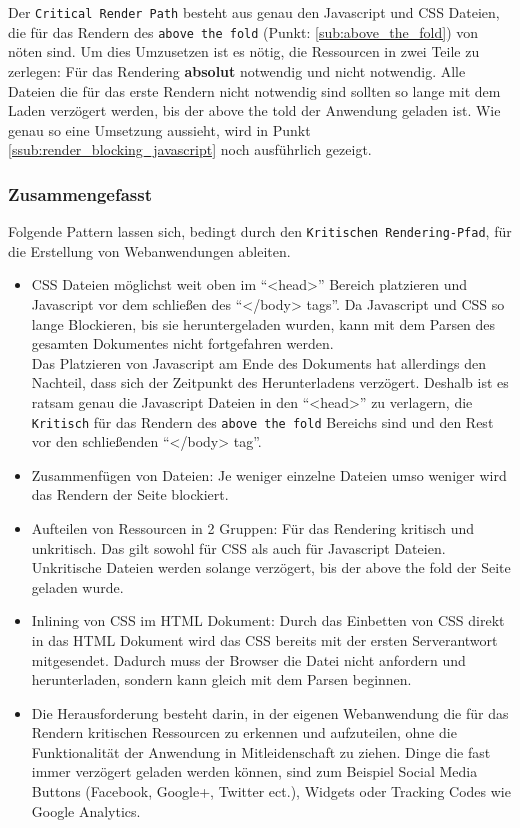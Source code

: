 			Der \texttt{Critical Render Path} besteht aus genau den Javascript und CSS Dateien, die für das Rendern des \texttt{above the fold} (Punkt: \ref{sub:above_the_fold}) von nöten sind. Um dies Umzusetzen ist es nötig, die Ressourcen in zwei Teile zu zerlegen: Für das Rendering \textbf{absolut} notwendig und nicht notwendig. Alle Dateien die für das erste Rendern nicht notwendig sind sollten so lange mit dem Laden verzögert werden, bis der above the told der Anwendung geladen ist. Wie genau so eine Umsetzung aussieht, wird in Punkt \ref{ssub:render_blocking_javascript} noch ausführlich gezeigt.


		\subsubsection{Zusammengefasst} %
		\label{ssub:zusammengefasst_render_path}
		  Folgende Pattern lassen sich, bedingt durch den \texttt{Kritischen Rendering-Pfad}, für die Erstellung von Webanwendungen ableiten.

			\begin{itemize}
				\item CSS Dateien möglichst weit oben im "`<head>"' Bereich platzieren und Javascript vor dem schließen des "`</body> tags"'. Da Javascript und CSS so lange Blockieren, bis sie heruntergeladen wurden, kann mit dem Parsen des gesamten Dokumentes nicht fortgefahren werden. \autocite{placingScripts}\\
				Das Platzieren von Javascript am Ende des Dokuments hat allerdings den Nachteil, dass sich der Zeitpunkt des Herunterladens verzögert. Deshalb ist es ratsam genau die Javascript Dateien in den "`<head>"' zu verlagern, die \texttt{Kritisch} für das Rendern des \texttt{above the fold} Bereichs sind und den Rest vor den schließenden "`</body> tag"'. 

				\item Zusammenfügen von Dateien: Je weniger einzelne Dateien umso weniger wird das Rendern der Seite blockiert.

				\item Aufteilen von Ressourcen in 2 Gruppen: Für das Rendering kritisch und unkritisch. Das gilt sowohl für CSS als auch für Javascript Dateien. Unkritische Dateien werden solange verzögert, bis der above the fold der Seite geladen wurde.

				\item Inlining von CSS im HTML Dokument: Durch das Einbetten von CSS direkt in das HTML Dokument wird das CSS bereits mit der ersten Serverantwort mitgesendet. Dadurch muss der Browser die Datei nicht anfordern und herunterladen, sondern kann gleich mit dem Parsen beginnen.

				\item Die Herausforderung besteht darin, in der eigenen Webanwendung die für das Rendern kritischen Ressourcen zu erkennen und aufzuteilen, ohne die Funktionalität der Anwendung in Mitleidenschaft zu ziehen. Dinge die fast immer verzögert geladen werden können, sind zum Beispiel Social Media Buttons (Facebook, Google+, Twitter ect.), Widgets oder Tracking Codes wie Google Analytics.
			\end{itemize}

